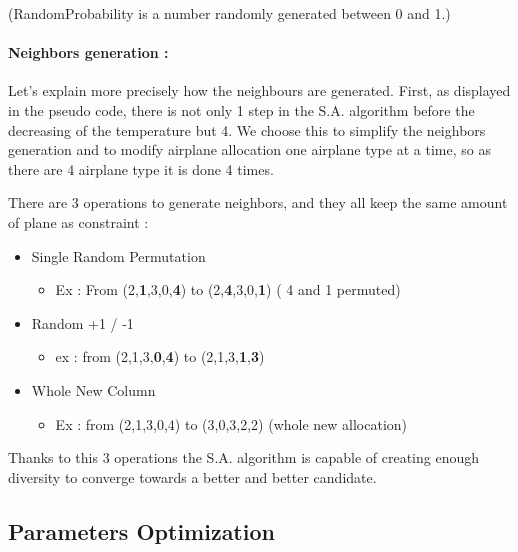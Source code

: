 \documentclass[11pt]{article}
\providecommand{\tightlist}{%
      \setlength{\itemsep}{0pt}\setlength{\parskip}{0pt}}
\begin{document}
(RandomProbability is a number randomly generated between 0 and 1.)

\hypertarget{neighbors-generation}{%
\paragraph{Neighbors generation : }\label{neighbors-generation}}

Let's explain more precisely how the neighbours are generated. First, as
displayed in the pseudo code, there is not only 1 step in the S.A.
algorithm before the decreasing of the temperature but 4. We choose this
to simplify the neighbors generation and to modify airplane allocation
one airplane type at a time, so as there are 4 airplane type it is done
4 times.

There are 3 operations to generate neighbors, and they all keep the same
amount of plane as constraint :

\begin{itemize}
\tightlist
\item
  Single Random Permutation

  \begin{itemize}
  \tightlist
  \item
    Ex : From (2,\textbf{1},3,0,\textbf{4}) to
    (2,\textbf{4},3,0,\textbf{1}) ( 4 and 1 permuted)
  \end{itemize}
\item
  Random +1 / -1

  \begin{itemize}
  \tightlist
  \item
    ex : from (2,1,3,\textbf{0},\textbf{4}) to
    (2,1,3,\textbf{1},\textbf{3})
  \end{itemize}
\item
  Whole New Column

  \begin{itemize}
  \tightlist
  \item
    Ex : from (2,1,3,0,4) to (3,0,3,2,2) (whole new allocation)
  \end{itemize}
\end{itemize}

Thanks to this 3 operations the S.A. algorithm is capable of creating
enough diversity to converge towards a better and better candidate.

\pagebreak

    \hypertarget{parameters-optimization}{%
\subsection{Parameters Optimization}\label{parameters-optimization}}
\end{document}

